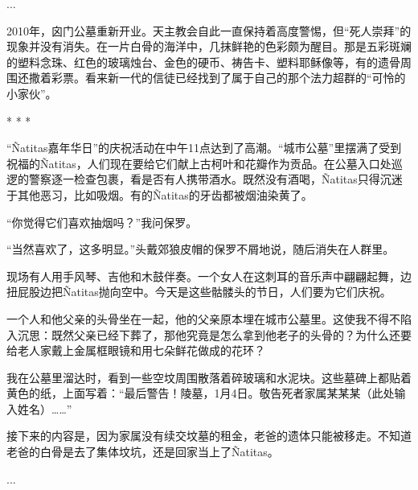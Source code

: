 \documentclass[12pt,oneside]{book}
\begin{document}
\begin{bookref}[frametitle={\cite{好好告别}}]
...

2010年，囟门公墓重新开业。天主教会自此一直保持着高度警惕，但“死人崇拜”的现象并没有消失。在一片白骨的海洋中，几抹鲜艳的色彩颇为醒目。那是五彩斑斓的塑料念珠、红色的玻璃烛台、金色的硬币、祷告卡、塑料耶稣像等，有的遗骨周围还撒着彩票。看来新一代的信徒已经找到了属于自己的那个法力超群的“可怜的小家伙”。

\begin{center}
* * *
\end{center}

“Ñatitas嘉年华日”的庆祝活动在中午11点达到了高潮。“城市公墓”里摆满了受到祝福的Ñatitas，人们现在要给它们献上古柯叶和花瓣作为贡品。在公墓入口处巡逻的警察逐一检查包裹，看是否有人携带酒水。既然没有酒喝，Ñatitas只得沉迷于其他恶习，比如吸烟。有的Ñatitas的牙齿都被烟油染黄了。

“你觉得它们喜欢抽烟吗？”我问保罗。

“当然喜欢了，这多明显。”头戴郊狼皮帽的保罗不屑地说，随后消失在人群里。

现场有人用手风琴、吉他和木鼓伴奏。一个女人在这刺耳的音乐声中翩翩起舞，边扭屁股边把Ñatitas抛向空中。今天是这些骷髅头的节日，人们要为它们庆祝。

一个人和他父亲的头骨坐在一起，他的父亲原本埋在城市公墓里。这使我不得不陷入沉思：既然父亲已经下葬了，那他究竟是怎么拿到他老子的头骨的？为什么还要给老人家戴上金属框眼镜和用七朵鲜花做成的花环？

我在公墓里溜达时，看到一些空坟周围散落着碎玻璃和水泥块。这些墓碑上都贴着黄色的纸，上面写着：“最后警告！陵墓，1月4日。敬告死者家属某某某（此处输入姓名）……”

接下来的内容是，因为家属没有续交坟墓的租金，老爸的遗体只能被移走。不知道老爸的白骨是去了集体坟坑，还是回家当上了Ñatitas。

...

\end{bookref}
\end{document}
